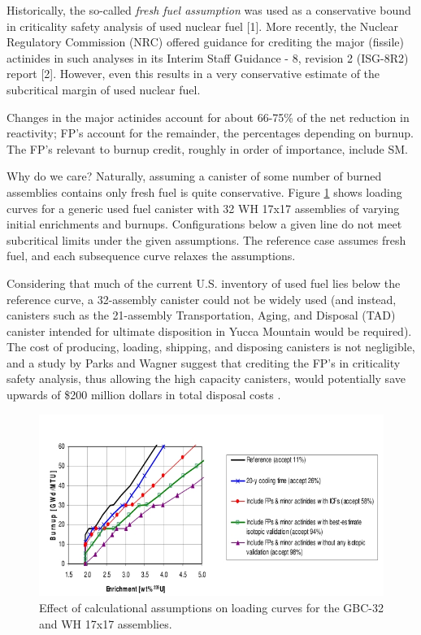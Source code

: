 Historically, the so-called \textit{fresh fuel assumption} was used as a conservative bound
in criticality safety analysis of used nuclear fuel [1]. More recently, the Nuclear
Regulatory Commission (NRC) offered guidance for crediting the major (fissile) actinides
in such analyses in its Interim Staff Guidance - 8, revision 2 (ISG-8R2) report [2]. However,
even this results in a very conservative estimate of the subcritical margin of used
nuclear fuel.

Changes in the major actinides account for about 66-75\% of the net reduction
in reactivity; FP's account for the remainder, the percentages depending on burnup.
The FP's relevant to burnup credit, roughly in order of importance, include SM.
 
Why do we care?  Naturally, assuming a canister of some number of burned assemblies 
contains only fresh fuel is quite conservative.  Figure \ref{fig:loading_curve} shows 
loading curves for a generic used fuel canister with 32 WH 17x17 assemblies of varying 
initial enrichments and burnups.  Configurations below a given line do not meet subcritical 
limits under the given assumptions.  The reference case assumes fresh fuel, and each 
subsequence curve relaxes the assumptions.  

Considering that much of the current U.S. inventory of used fuel lies below the reference 
curve, a 32-assembly canister could not be widely used (and instead, canisters such as
the 21-assembly Transportation, Aging, and Disposal (TAD) canister \cite{tad} 
intended for ultimate
disposition in Yucca Mountain would be required).  The cost of producing, loading, shipping, 
and disposing canisters is not negligible, and a study by Parks and Wagner suggest that
crediting the FP's in criticality safety analysis, thus allowing the high capacity
canisters, would potentially save upwards of \$200 million dollars in total disposal
costs \cite{parks2004csp}. 

\begin{figure}[ht] 
    \centering
    \includegraphics[keepaspectratio, width = 5.0 in]{images/loading_curve}
    \caption{Effect of calculational assumptions on loading curves for the GBC-32 and WH 17x17 assemblies.}
    \label{fig:loading_curve}
\end{figure}

